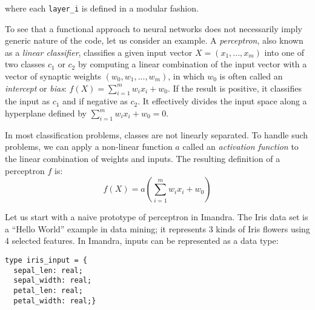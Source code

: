 \documentclass[runningheads]{llncs}
\begin{document}
where each \lstinline?layer_i? is defined in a modular fashion. 


 To see that a functional approach to neural networks does not necessarily imply generic nature of the code, 
let us consider an example. 
A \emph{perceptron}, also known as a \emph{linear classifier}, classifies a given input vector $X = (x_1, ..., x_m)$ into one of two classes $c_1$ or $c_2$ by computing a linear combination of the input vector with a vector of synaptic weights $(w_0, w_1, ..., w_m)$, in which $w_0$ is often called an \emph{intercept} or \emph{bias}: 
	$ f(X) = 	\sum_{i=1}^{m}w_ix_i + w_0 $.
If the result is positive, it classifies the input as $c_1$ and if negative as $c_2$. It effectively divides the input space along a hyperplane defined by
$\sum_{i=1}^{m}w_ix_i + w_0 = 0$. 



In most classification problems, classes are not linearly separated. To handle such problems, we can apply a non-linear function $a$ called an \textit{activation function} to the linear combination of weights and inputs. The resulting definition of a perceptron $f$ is:
\begin{equation}\label{eq:perceptron}
	f(X) = a\left(\sum_{i=1}^{m}w_ix_i + w_0\right)
      \end{equation}

     Let us start with a naive prototype of perceptron in Imandra.  The Iris data set is a ``Hello World'' example in data mining; it represents 3 kinds of Iris flowers using 4 selected features.
      In Imandra, inputs can be represented as a data type: %

\begin{lstlisting}[language=caml]
type iris_input = {
  sepal_len: real;
  sepal_width: real;
  petal_len: real;
  petal_width: real;}
\end{lstlisting}
\end{document}
